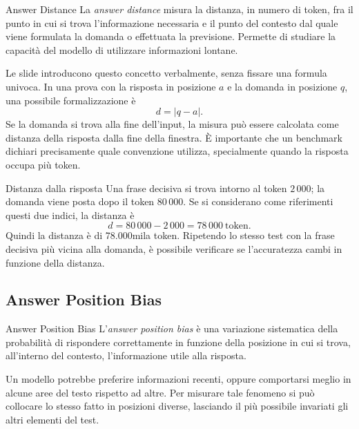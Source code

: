 \begin{definition}{Answer Distance}
La \emph{answer distance} misura la distanza, in numero di token, fra il punto in cui si trova l'informazione necessaria e il punto del contesto dal quale viene formulata la domanda o effettuata la previsione. Permette di studiare la capacità del modello di utilizzare informazioni lontane.
\end{definition}

Le slide introducono questo concetto verbalmente, senza fissare una formula univoca. In una prova con la risposta in posizione $a$ e la domanda in posizione $q$, una possibile formalizzazione è
\begin{equation}
d=|q-a|.
\end{equation}
Se la domanda si trova alla fine dell'input, la misura può essere calcolata come distanza della risposta dalla fine della finestra. È importante che un benchmark dichiari precisamente quale convenzione utilizza, specialmente quando la risposta occupa più token.

\begin{example}{Distanza dalla risposta}
Una frase decisiva si trova intorno al token $2\,000$; la domanda viene posta dopo il token $80\,000$. Se si considerano come riferimenti questi due indici, la distanza è
\begin{equation}
d=80\,000-2\,000=78\,000\ \text{token}.
\end{equation}
Quindi la distanza è di 78.000mila token. Ripetendo lo stesso test con la frase decisiva più vicina alla domanda, è possibile verificare se l'accuratezza cambi in funzione della distanza.
\end{example}

\subsection{Answer Position Bias}

\begin{definition}{Answer Position Bias}
L'\emph{answer position bias} è una variazione sistematica della probabilità di rispondere correttamente in funzione della posizione in cui si trova, all'interno del contesto, l'informazione utile alla risposta.
\end{definition}

Un modello potrebbe preferire informazioni recenti, oppure comportarsi meglio in alcune aree del testo rispetto ad altre. Per misurare tale fenomeno si può collocare lo stesso fatto in posizioni diverse, lasciando il più possibile invariati gli altri elementi del test.

